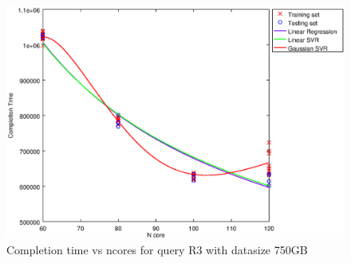 
\begin {figure}[hbtp]
\centering
\includegraphics[width=\textwidth]{output/R3_750_ONLY_1_OVER_NCORES/plot_R3_750_bestmodels.eps}
\caption{Completion time vs ncores for query R3 with datasize 750GB}
\label{fig:all_nonlinear_R3_750}
\end {figure}
